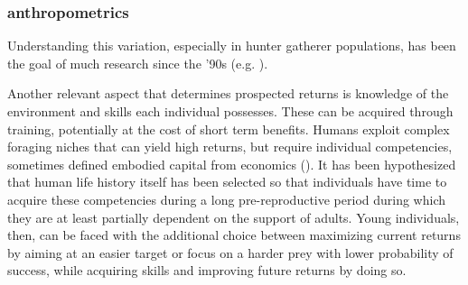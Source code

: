 \subsubsection{anthropometrics}








Understanding this variation, especially in hunter gatherer populations, has been the goal of much research since the '90s (e.g. \cite{blurton_jones_modelling_1989, blurton_jones_foraging_1994, blurton_jones_why_1997, bird_children_1995}). %



Another relevant aspect that determines prospected returns is knowledge of the environment and skills each individual possesses. These can be acquired through training, potentially at the cost of short term benefits. Humans exploit complex foraging niches that can yield high returns, but require individual competencies, sometimes defined embodied capital from economics (\cite{kaplan_theory_2000}). It has been hypothesized that human life history itself has been selected so that individuals have time to acquire these competencies during a long pre-reproductive period during which they are at least partially dependent on the support of adults. Young individuals, then, can be faced with the additional choice between maximizing current returns by aiming at an easier target or focus on a harder prey with lower probability of success, while acquiring skills and improving future returns by doing so. 

